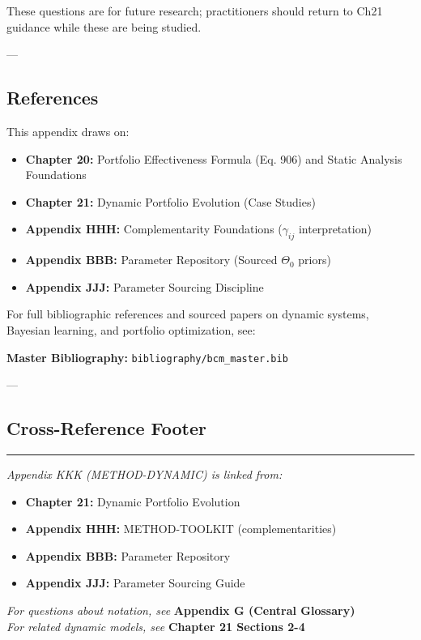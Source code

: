 These questions are for future research; practitioners should return to Ch21 guidance while these are being studied.

---


\subsection*{References}

This appendix draws on:
\begin{itemize}[nosep]
\item \textbf{Chapter 20:} Portfolio Effectiveness Formula (Eq. 906) and Static Analysis Foundations
\item \textbf{Chapter 21:} Dynamic Portfolio Evolution (Case Studies)
\item \textbf{Appendix HHH:} Complementarity Foundations ($\gamma_{ij}$ interpretation)
\item \textbf{Appendix BBB:} Parameter Repository (Sourced $\Theta_0$ priors)
\item \textbf{Appendix JJJ:} Parameter Sourcing Discipline
\end{itemize}

For full bibliographic references and sourced papers on dynamic systems, Bayesian learning, and portfolio optimization, see:

\vspace{0.3cm}
\textbf{Master Bibliography:} \texttt{bibliography/bcm\_master.bib}

\nocite{bcm_master}

---

\subsection*{Cross-Reference Footer}

\begin{center}
\rule{0.8\textwidth}{0.5pt}

\textit{Appendix KKK (METHOD-DYNAMIC) is linked from:}
\begin{itemize}[nosep]
\item \textbf{Chapter 21:} Dynamic Portfolio Evolution
\item \textbf{Appendix HHH:} METHOD-TOOLKIT (complementarities)
\item \textbf{Appendix BBB:} Parameter Repository
\item \textbf{Appendix JJJ:} Parameter Sourcing Guide
\end{itemize}

\vspace{0.2cm}

\textit{For questions about notation, see} \textbf{Appendix G (Central Glossary)} \\
\textit{For related dynamic models, see} \textbf{Chapter 21 Sections 2-4}

\end{center}

